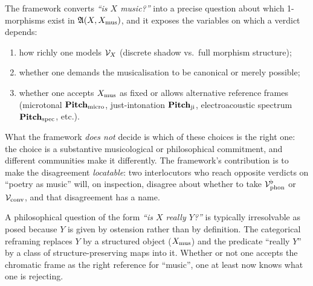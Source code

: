 The framework converts \emph{``is $X$ music?''} into a precise
question about which 1-morphisms exist in $\mathfrak{A}(X, X_{\mathrm{mus}})$, and it
exposes the variables on which a verdict depends:
\begin{enumerate}[label=\textup{(\roman*)}, leftmargin=2em]
\item how richly one models $\mathcal{V}_X$ (discrete shadow vs.\ full
morphism structure);
\item whether one demands the musicalisation to be canonical or
merely possible;
\item whether one accepts $X_{\mathrm{mus}}$ as fixed or allows alternative
reference frames (microtonal $\mathbf{Pitch}_{\mathrm{micro}}$, just-intonation
$\mathbf{Pitch}_{\mathrm{ji}}$, electroacoustic spectrum
$\mathbf{Pitch}_{\mathrm{spec}}$, etc.).
\end{enumerate}

\noindent What the framework \emph{does not} decide is which of these
choices is the right one: the choice is a substantive musicological
or philosophical commitment, and different communities make it
differently. The framework's contribution is to make the disagreement
\emph{locatable}: two interlocutors who reach opposite verdicts on
``poetry as music'' will, on inspection, disagree about whether to
take $\mathcal{V}_{\mathrm{phon}}^\flat$ or $\mathcal{V}_{\mathrm{conv}}$, and that
disagreement has a name.

\begin{remark}
A philosophical question of the form \emph{``is $X$ really $Y$?''} is
typically irresolvable as posed because $Y$ is given by ostension
rather than by definition. The categorical reframing replaces $Y$ by
a structured object ($X_{\mathrm{mus}}$) and the predicate ``really $Y$'' by a
class of structure-preserving maps into it. Whether or not one
accepts the chromatic frame as the right reference for ``music'',
one at least now knows what one is rejecting.
\end{remark}

\endgroup
